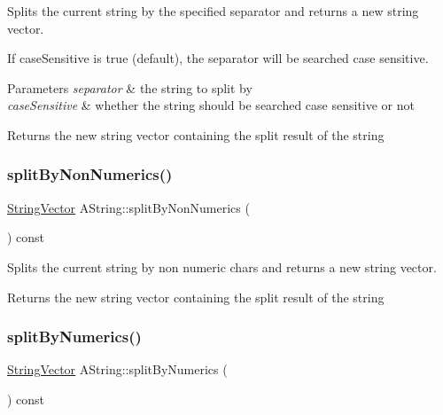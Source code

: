 Splits the current string by the specified separator and returns a new string vector. 

If case\+Sensitive is true (default), the separator will be searched case sensitive.


\begin{DoxyParams}{Parameters}
{\em separator} & the string to split by \\
\hline
{\em case\+Sensitive} & whether the string should be searched case sensitive or not \\
\hline
\end{DoxyParams}
\begin{DoxyReturn}{Returns}
the new string vector containing the split result of the string 
\end{DoxyReturn}
\mbox{\label{class_a_string_a16ed628b786ec5d4b570df1249637ef9}} 
\subsubsection{\texorpdfstring{splitByNonNumerics()}{splitByNonNumerics()}}
{\footnotesize\ttfamily \mbox{\hyperlink{class_string_vector}{String\+Vector}} A\+String\+::split\+By\+Non\+Numerics (\begin{DoxyParamCaption}{ }\end{DoxyParamCaption}) const}



Splits the current string by non numeric chars and returns a new string vector. 

\begin{DoxyReturn}{Returns}
the new string vector containing the split result of the string 
\end{DoxyReturn}
\mbox{\label{class_a_string_aaae243575004e5091025cacf9313ea76}} 
\subsubsection{\texorpdfstring{splitByNumerics()}{splitByNumerics()}}
{\footnotesize\ttfamily \mbox{\hyperlink{class_string_vector}{String\+Vector}} A\+String\+::split\+By\+Numerics (\begin{DoxyParamCaption}{ }\end{DoxyParamCaption}) const}



